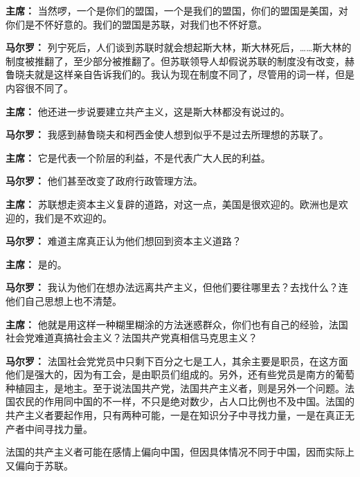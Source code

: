 \begin{list}{}
\item[\textbf{主席：}] 当然啰，一个是你们的盟国，一个是我们的盟国，你们的盟国是美国，对你们是不怀好意的。我们的盟国是苏联，对我们也不怀好意。

\item[\textbf{马尔罗：}] 列宁死后，人们谈到苏联时就会想起斯大林，斯大林死后，……斯大林的制度被推翻了，至少部分被推翻了。但苏联领导人却假说苏联的制度没有改变，赫鲁晓夫就是这样亲自告诉我们的。我认为现在制度不同了，尽管用的词一样，但是内容很不同了。

\item[\textbf{主席：}] 他还进一步说要建立共产主义，这是斯大林都没有说过的。

\item[\textbf{马尔罗：}] 我感到赫鲁晓夫和柯西金使人想到似乎不是过去所理想的苏联了。

\item[\textbf{主席：}] 它是代表一个阶层的利益，不是代表广大人民的利益。

\item[\textbf{马尔罗：}] 他们甚至改变了政府行政管理方法。

\item[\textbf{主席：}] 苏联想走资本主义复辟的道路，对这一点，美国是很欢迎的。欧洲也是欢迎的，我们是不欢迎的。

\item[\textbf{马尔罗：}] 难道主席真正认为他们想回到资本主义道路？

\item[\textbf{主席：}] 是的。

\item[\textbf{马尔罗：}] 我认为他们在想办法远离共产主义，但他们要往哪里去？去找什么？连他们自己思想上也不清楚。

\item[\textbf{主席：}] 他就是用这样一种糊里糊涂的方法迷惑群众，你们也有自己的经验，法国社会党难道真搞社会主义？法国共产党真相信马克思主义？

\item[\textbf{马尔罗：}] 法国社会党党员中只剩下百分之七是工人，其余主要是职员，在这方面他们是强大的，因为有工会，是由职员们组成的。另外，还有些党员是南方的葡萄种植园主，是地主。至于说法国共产党，法国共产主义者，则是另外一个问题。法国农民的作用同中国的不一样，不只是绝对数少，占人口比例也不及中国。法国的共产主义者要起作用，只有两种可能，一是在知识分子中寻找力量，一是在真正无产者中间寻找力量。

法国的共产主义者可能在感情上偏向中国，但因具体情况不同于中国，因而实际上又偏向于苏联。


\end{list}
